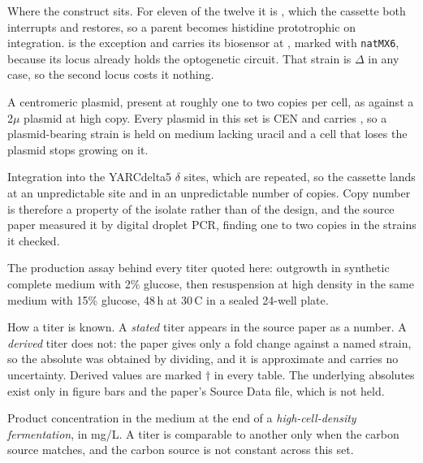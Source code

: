 \begin{description}[leftmargin=1.2em,itemsep=2pt,topsep=2pt]
\item[biosensor locus] Where the construct sits. For eleven of the twelve it is
  , which the cassette both interrupts and restores, so a
   parent becomes histidine prototrophic on integration.
   is the exception and carries its biosensor at ,
  marked with \texttt{natMX6}, because its  locus already holds the
  optogenetic circuit. That strain is $\Delta$ in any case, so the
  second locus costs it nothing.

\item[CEN plasmid] A centromeric plasmid, present at roughly one to two copies
  per cell, as against a 2$\mu$ plasmid at high copy. Every plasmid in this set
  is CEN and carries , so a plasmid-bearing strain is held on medium
  lacking uracil and a cell that loses the plasmid stops growing on it.

\item[$\delta$-integration] Integration into the YARCdelta5 $\delta$ sites,
  which are repeated, so the cassette lands at an unpredictable site and in an
  unpredictable number of copies. Copy number is therefore a property of the
  isolate rather than of the design, and the source paper measured it by digital
  droplet PCR, finding one to two copies in the strains it checked.

\item[high-cell-density fermentation] The production assay behind every titer
  quoted here: outgrowth in synthetic complete medium with 2\% glucose, then
  resuspension at high density in the same medium with 15\% glucose, 48\,h at
  30\,\textdegree C in a sealed 24-well plate.

\item[stated, derived] How a titer is known. A \emph{stated} titer appears in the
  source paper as a number. A \emph{derived} titer does not: the paper gives only
  a fold change against a named strain, so the absolute was obtained by dividing,
  and it is approximate and carries no uncertainty. Derived values are marked
  $\dagger$ in every table. The underlying absolutes exist only in figure bars
  and the paper's Source Data file, which is not held.

\item[titer] Product concentration in the medium at the end of a
  \emph{high-cell-density fermentation}, in mg/L. A titer is comparable to
  another only when the carbon source matches, and the carbon source is not
  constant across this set.

\end{description}
